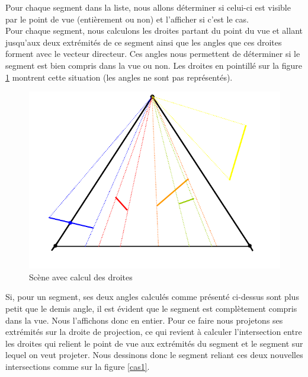 \documentclass[11pt,a4paper]{article}
\theoremstyle{definition}
\theoremstyle{remark}
\begin{document}
Pour chaque segment dans la liste, nous allons déterminer si celui-ci est visible par le point de vue (entièrement ou non) et l'afficher si c'est le cas.\\

Pour chaque segment, nous calculons les droites partant du point du vue et allant jusqu'aux deux extrémités de ce segment ainsi que les angles que ces droites forment avec le vecteur directeur. Ces angles nous permettent de déterminer si le segment est bien compris dans la vue ou non. Les droites en pointillé sur la figure \ref{exp_3} montrent cette situation (les angles ne sont pas représentés).

\begin{figure}[H]
\centering
\includegraphics[scale=0.6]{inter.png}
\caption{Scène avec calcul des droites}
\label{exp_3}
\end{figure}

Si, pour un segment, ses deux angles calculés comme présenté ci-dessus sont plus petit que le demis angle, il est évident que le segment est complètement compris dans la vue. Nous l'affichons donc en entier. Pour ce faire nous projetons ses extrémités sur la droite de projection, ce qui revient à calculer l'intersection entre les droites qui relient le point de vue aux extrémités du segment et le segment sur lequel on veut projeter. Nous dessinons donc le segment reliant ces deux nouvelles intersections comme sur la figure \ref{cas1}.
\end{document}
